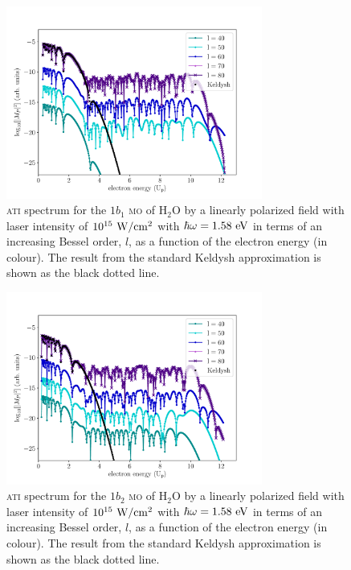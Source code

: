 \begin{figure}
  \centering
  \includegraphics[width=0.75\textwidth]
                  {figures/ch_ATI_SFA/1b1/l40to80n512WP50PG25MR35vsKeldysh.pdf}
  \caption{\textsc{ati} spectrum for the $1b_{1}$ \textsc{mo} of
    H$_{2}$O by a linearly polarized field with laser intensity of
    $10^{15}\ \rm{W/cm^{2}}$ with $\hbar\omega = 1.58\ \rm{eV}$ in
    terms of an increasing Bessel order, $l$, as a function of the
    electron energy (in colour). The result from the standard Keldysh
    approximation is shown as the black dotted line.}
  \label{fig:1b1_spectrum}
\end{figure}

\begin{figure}
  \centering
  \includegraphics[width=0.75\textwidth]
                  {figures/ch_ATI_SFA/1b2/l40to80n512WP50PG25MR35vsKeldysh.pdf}
  \caption{\textsc{ati} spectrum for the $1b_{2}$ \textsc{mo} of
    H$_{2}$O by a linearly polarized field with laser intensity of
    $10^{15}\ \rm{W/cm^{2}}$ with $\hbar\omega = 1.58\ \rm{eV}$ in
    terms of an increasing Bessel order, $l$, as a function of the
    electron energy (in colour). The result from the standard Keldysh
    approximation is shown as the black dotted line.}
  \label{fig:1b2_spectrum}
\end{figure}





